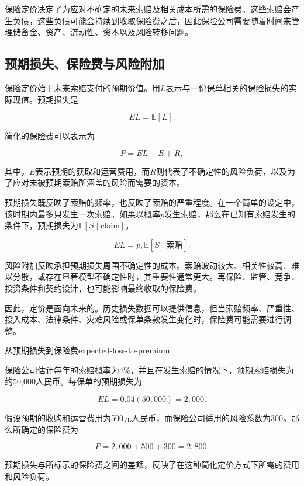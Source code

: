 保险定价决定了为应对不确定的未来索赔及相关成本所需的保险费。这些索赔会产生负债，这些负债可能会持续到收取保险费之后，因此保险公司需要随着时间来管理储备金、资产、流动性、资本以及风险转移问题。


\subsection{预期损失、保险费与风险附加}

保险定价始于未来索赔支付的预期价值。用$L$表示与一份保单相关的保险损失的实际现值。预期损失是

\begin{equation}
EL=\mathbb{E}[L].
\label{eq:ch15-expected-loss}
\end{equation}

简化的保险费可以表示为

\begin{equation}
P=EL+E+R,
\label{eq:ch15-premium-decomposition}
\end{equation}

其中，$E$表示预期的获取和运营费用，而$R$则代表了不确定性的风险负荷，以及为了应对未被预期索赔所涵盖的风险而需要的资本。

预期损失既反映了索赔的频率，也反映了索赔的严重程度。在一个简单的设定中，该时期内最多只发生一次索赔。如果以概率$p$发生索赔，那么在已知有索赔发生的条件下，预期损失为$\mathbb{E}[S\mid \text{claim}]$。

\begin{equation}
EL=
p,\mathbb{E}[S\mid \text{索赔}].
\label{eq:ch15-frequency-severity}
\end{equation}

风险附加反映承担预期损失周围不确定性的成本。索赔波动较大、相关性较高、难以分散，或存在显著模型不确定性时，其重要性通常更大。再保险、监管、竞争、投资条件和契约设计，也可能影响最终收取的保险费。

因此，定价是面向未来的。历史损失数据可以提供信息，但当索赔频率、严重性、投入成本、法律条件、灾难风险或保单条款发生变化时，保险费可能需要进行调整。

\begin{example}{从预期损失到保险费}{expected-loss-to-premium}

保险公司估计每年的索赔概率为4\%，并且在发生索赔的情况下，预期索赔损失为约50,000人民币。每保单的预期损失为

$$
EL=0.04(50{,}000)=2{,}000.
$$

假设预期的收购和运营费用为500元人民币，而保险公司适用的风险系数为300。那么所确定的保险费为

$$
P=2{,}000+500+300=2{,}800.
$$

预期损失与所标示的保险费之间的差额，反映了在这种简化定价方式下所需的费用和风险负荷。

\end{example}


